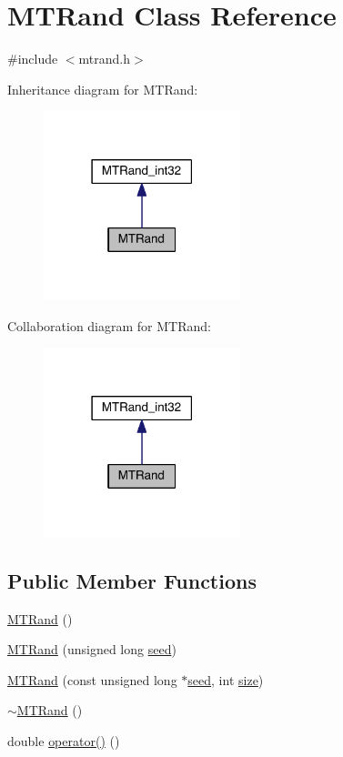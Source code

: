 \hypertarget{a00016}{\section{M\-T\-Rand Class Reference}
\label{a00016}
}


{\ttfamily \#include $<$mtrand.\-h$>$}



Inheritance diagram for M\-T\-Rand\-:\nopagebreak
\begin{figure}[H]
\begin{center}
\leavevmode
\includegraphics[width=162pt]{a00151}
\end{center}
\end{figure}


Collaboration diagram for M\-T\-Rand\-:\nopagebreak
\begin{figure}[H]
\begin{center}
\leavevmode
\includegraphics[width=162pt]{a00152}
\end{center}
\end{figure}
\subsection*{Public Member Functions}
\begin{DoxyCompactItemize}
\item 
\hyperlink{a00016_a265dc65546e26073c0d5f8787b045a1d}{M\-T\-Rand} ()
\item 
\hyperlink{a00016_a2c88736896bcbdb54bcdd7a0026720d5}{M\-T\-Rand} (unsigned long \hyperlink{a00019_a0c57076fe30358e0700a7ce1baa0ea27}{seed})
\item 
\hyperlink{a00016_a6075a3beacdfb8e4cf48d9fb56cc193a}{M\-T\-Rand} (const unsigned long $\ast$\hyperlink{a00019_a0c57076fe30358e0700a7ce1baa0ea27}{seed}, int \hyperlink{a00062_ae113ea7f9e515a12ac4b5595c6faf61e}{size})
\item 
\hyperlink{a00016_a8c276546a41ae350dc9efc5e9c10a261}{$\sim$\-M\-T\-Rand} ()
\item 
double \hyperlink{a00016_abbb87a08d622d58fdee0eea4cb5471a0}{operator()} ()
\end{DoxyCompactItemize}
